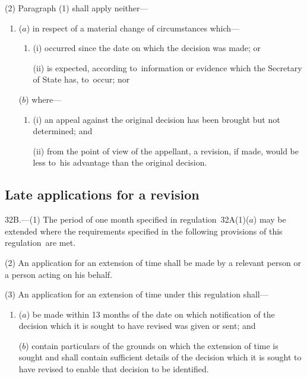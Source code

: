 \documentclass[12pt,a4paper]{article}
\begin{document}
(2) Paragraph (1) shall apply neither---
\begin{enumerate}\item[]
\begin{sloppypar}
($a$) in respect of a material change of circumstances which—
\end{sloppypar}
\begin{enumerate}\item[]
(i) occurred since 
the date on which the decision was made;  %
or

(ii) is expected, according to~information or evidence which the Secretary of State has, to~occur; nor
\end{enumerate}

($b$) where---
\begin{enumerate}\item[]
(i) an appeal against the original decision has been brought but not determined; and

(ii) from the point of view of the appellant, a revision, if made, would be less to~his advantage than the original decision.
\end{enumerate}
\end{enumerate}


\subsection[32B. Late applications for a revision]{Late applications for a revision}

32B.—(1) The period of one month specified in regulation~32A(1)($a$) may be extended where the requirements specified in the following provisions of this regulation~are met.

(2) An application for an extension of time shall be made by a relevant person or a person acting on his behalf.

(3) An application for an extension of time under this regulation shall---
\begin{enumerate}\item[]
($a$) be made within 13 months of the date on which notification of the decision which it is sought to have revised was given or sent; and

($b$) contain particulars of the grounds on which the extension of time is sought and shall contain sufficient details of the decision which it is sought to have revised to enable that decision to be identified.
\end{enumerate}
\end{document}
